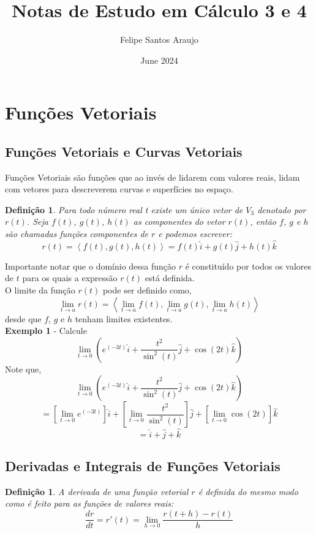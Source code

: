 \documentclass[a4paper,12pt]{article}
\title{Notas de Estudo em Cálculo 3 e 4}
\author{Felipe Santos Araujo}
\date{June 2024}
\begin{document}
\maketitle

\newpage
\tableofcontents{}

\newpage
\section{Funções Vetoriais}
\subsection{Funções Vetoriais e Curvas Vetoriais}
    \newtheorem{definition}{Definição}
    Funções Vetoriais são funções que ao invés de lidarem com valores reais, lidam com vetores para descreverem curvas e superfícies no espaço.
        \begin{definition}
            Para todo número real \textit{t} existe um único vetor de $V_3$ denotado por $r(t)$. Seja $f(t)$, $g(t)$, $h(t)$ as componentes do vetor $r(t)$, então $f$, $g$ e $h$ são chamadas funções componentes de $r$ e podemos escrever:
            \[r(t) = \left<f(t), g(t), h(t) \right> = f(t)\hat{i} + g(t)\hat{j} + h(t)\hat{k}\]
        \end{definition}
    Importante notar que o domínio dessa função $r$ é constituído por todos os valores de $t$ para os quais a expressão $r(t)$ está definida.\\

    O limite da função $r(t)$ pode ser definido como,
    \[\lim_{t \to a} r(t) = \left<\lim_{t \to a}f(t), \lim_{t \to a}g(t), \lim_{t \to a}h(t) \right>\]
    desde que $f$, $g$ e $h$ tenham limites existentes.\\
    \textbf{Exemplo 1} - Calcule
    \[\lim_{t \to 0} (e^{(-3t)}\hat{i} + \frac{t^2}{\sin^2{(t)}}\hat{j} + \cos{(2t)}\hat{k})\]
    Note que,
     \[\lim_{t \to 0} (e^{(-3t)}\hat{i} + \frac{t^2}{\sin^2{(t)}}\hat{j} + \cos{(2t)}\hat{k})\]
     \[= [\lim_{t \to 0}e^{(-3t)}]\hat{i} + [\lim_{t \to 0}\frac{t^2}{\sin^2{(t)}}]\hat{j} + [\lim_{t \to 0}\cos{(2t)}]\hat{k}\]
     \[= \hat{i} + \hat{j} + \hat{k}\]
\newpage
\subsection{Derivadas e Integrais de Funções Vetoriais}
    \newtheorem{definition}{Definição}
        \begin{definition}
            A derivada de uma função vetorial $r$ é definida do mesmo modo como é feito para as funções de valores reais:
            \[\dfrac{dr}{dt} = r'(t) = \lim_{h \to 0} \frac{r(t + h) - r(t)}{h}\]
        \end{definition}
\end{document}
